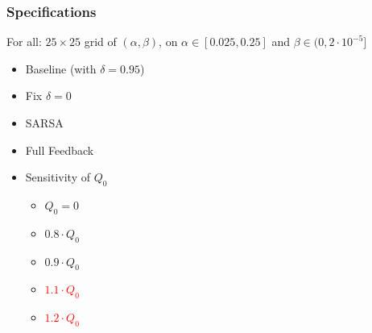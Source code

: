 \documentclass{beamer}
\begin{document}
\begin{frame}\frametitle{Specifications}
	For all: $25 \times 25$ grid of $(\alpha,\beta)$, on $\alpha \in [0.025,0.25]$ and $\beta \in (0,2\cdot 10^{-5}]$
	\begin{itemize}
		\item Baseline (with $\delta = 0.95$)
		\item Fix $\delta = 0$
		\item SARSA
		\item Full Feedback
		\item Sensitivity of $Q_0$ \begin{itemize} \item $Q_0 = 0$ \item $0.8 \cdot Q_0$ \item $0.9 \cdot Q_0$ \item \textcolor{red}{$1.1 \cdot Q_0$} \item \textcolor{red}{$1.2 \cdot Q_0$}\end{itemize}
	\end{itemize}
\end{frame}
\end{document}
